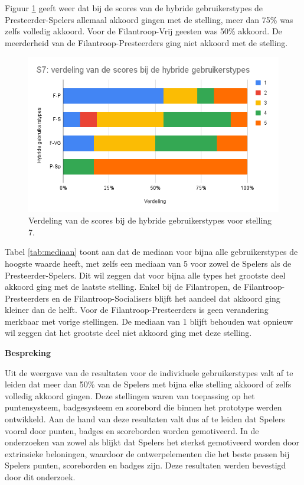 Figuur \ref{fig:s7_hybride} geeft weer dat bij de scores van de hybride gebruikerstypes de Presteerder-Spelers allemaal akkoord gingen met de stelling, meer dan 75\% was zelfs volledig akkoord. Voor de Filantroop-Vrij geesten was 50\% akkoord. De meerderheid van de Filantroop-Presteerders ging niet akkoord met de stelling.

\begin{figure}
    \includegraphics[width=\linewidth]{S7_Hybride.png}
    \caption{Verdeling van de scores bij de hybride gebruikerstypes voor stelling 7.}
    \label{fig:s7_hybride}
\end{figure}

Tabel \ref{tab:mediaan} toont aan dat de mediaan voor bijna alle gebruikerstypes de hoogste waarde heeft, met zelfs een mediaan van 5 voor zowel de Spelers als de Presteerder-Spelers. Dit wil zeggen dat voor bijna alle types het grootste deel akkoord ging met de laatste stelling. Enkel bij de Filantropen, de Filantroop-Presteerders en de Filantroop-Socialisers blijft het aandeel dat akkoord ging kleiner dan de helft. Voor de Filantroop-Presteerders is geen verandering merkbaar met vorige stellingen. De mediaan van 1 blijft behouden wat opnieuw wil zeggen dat het grootste deel niet akkoord ging met deze stelling.

\textbf{Bespreking}

Uit de weergave van de resultaten voor de individuele gebruikerstypes valt af te leiden dat meer dan 50\% van de Spelers met bijna elke stelling akkoord of zelfs volledig akkoord gingen. Deze stellingen waren van toepassing op het puntensysteem, badgesysteem en scorebord die binnen het prototype werden ontwikkeld. Aan de hand van deze resultaten valt dus af te leiden dat Spelers vooral door punten, badges en scoreborden worden gemotiveerd. In de onderzoeken van zowel \textcite{Tondello2016} als \textcite{Carreno2018} blijkt dat Spelers het sterkst gemotiveerd worden door extrinsieke beloningen, waardoor de ontwerpelementen die het beste passen bij Spelers punten, scoreborden en badges zijn. Deze resultaten werden bevestigd door dit onderzoek.

